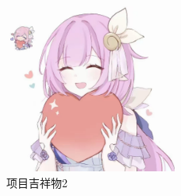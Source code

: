 \begin{figure}
    \centering
    \includegraphics[width=0.5\textwidth]{images/1_4_xibr.jpg}
    \caption{项目吉祥物2}
    \label{fig:mascot2}
\end{figure}